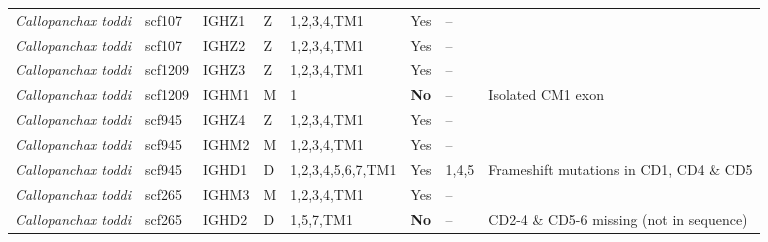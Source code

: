\begin{tabular}{>{\itshape}lllllllp{4cm}}
  Callopanchax toddi & scf107 & IGHZ1 & Z & 1,2,3,4,TM1 & Yes & -- &  \\ 
  Callopanchax toddi & scf107 & IGHZ2 & Z & 1,2,3,4,TM1 & Yes & -- &  \\ 
  Callopanchax toddi & scf1209 & IGHZ3 & Z & 1,2,3,4,TM1 & Yes & -- &  \\ 
  Callopanchax toddi & scf1209 & IGHM1 & M & 1 & \textbf{No} & -- & Isolated CM1 exon \\ 
  Callopanchax toddi & scf945 & IGHZ4 & Z & 1,2,3,4,TM1 & Yes & -- &  \\ 
  Callopanchax toddi & scf945 & IGHM2 & M & 1,2,3,4,TM1 & Yes & -- &  \\ 
  Callopanchax toddi & scf945 & IGHD1 & D & 1,2,3,4,5,6,7,TM1 & Yes & 1,4,5 & Frameshift mutations in CD1, CD4 \& CD5 \\ 
  Callopanchax toddi & scf265 & IGHM3 & M & 1,2,3,4,TM1 & Yes & -- &  \\ 
  Callopanchax toddi & scf265 & IGHD2 & D & 1,5,7,TM1 & \textbf{No} & -- & CD2-4 \& CD5-6 missing (not in sequence) \\ 
   \bottomrule \end{tabular}
